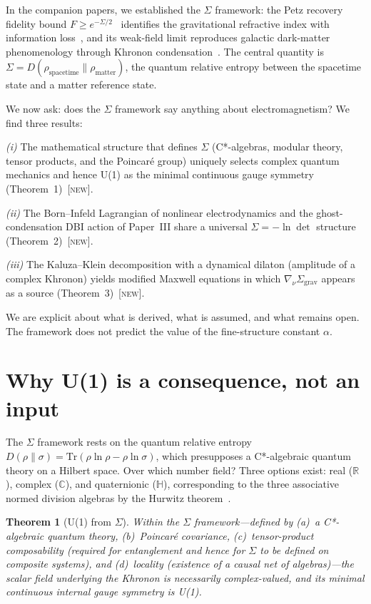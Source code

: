 \documentclass[prl,twocolumn,superscriptaddress,longbibliography]{revtex4-2}
\newtheorem{theorem}{Theorem}
\newcommand{\Tr}{\mathrm{Tr}}
\newcommand{\Sgrav}{\Sigma_{\mathrm{grav}}}
\newcommand{\new}{\textsc{[new]}}
\begin{document}
In the companion papers, we established the $\Sigma$ framework:
the Petz recovery fidelity bound
$F \geq e^{-\Sigma/2}$~\cite{PaperI} identifies the
gravitational refractive index with information loss~\cite{PaperII},
and its weak-field limit reproduces galactic dark-matter
phenomenology through Khronon condensation~\cite{PaperIII}.
The central quantity is
$\Sigma = D(\rho_{\mathrm{spacetime}} \| \rho_{\mathrm{matter}})$,
the quantum relative entropy between the spacetime state and a
matter reference state.

We now ask: does the $\Sigma$ framework say anything about
electromagnetism?
We find three results:

\textit{(i)} The mathematical structure that defines $\Sigma$
(C*-algebras, modular theory, tensor products, and the
Poincar\'{e} group) uniquely selects complex quantum mechanics
and hence U(1) as the minimal continuous gauge symmetry
(Theorem~1)~\new{}.

\textit{(ii)} The Born--Infeld Lagrangian of nonlinear
electrodynamics and the ghost-condensation DBI action of
Paper~III share a universal $\Sigma = -\ln\det$ structure
(Theorem~2)~\new{}.

\textit{(iii)} The Kaluza--Klein decomposition with a dynamical
dilaton (amplitude of a complex Khronon) yields modified Maxwell
equations in which $\nabla_\nu\Sgrav$ appears as a source
(Theorem~3)~\new{}.

We are explicit about what is derived, what is assumed, and what
remains open.
The framework does not predict the value of the fine-structure
constant $\alpha$.

\section{Why U(1) is a consequence, not an input}
\label{sec:u1}

The $\Sigma$ framework rests on the quantum relative entropy
$D(\rho\|\sigma) = \Tr(\rho\ln\rho - \rho\ln\sigma)$, which
presupposes a C*-algebraic quantum theory on a Hilbert space.
Over which number field?
Three options exist: real ($\mathbb{R}$), complex ($\mathbb{C}$),
and quaternionic ($\mathbb{H}$), corresponding to the three
associative normed division algebras by the Hurwitz
theorem~\cite{Solèr1995}.

\begin{theorem}[U(1) from $\Sigma$]
\label{thm:u1}
Within the $\Sigma$ framework---defined by
(a)~a C*-algebraic quantum theory,
(b)~Poincar\'{e} covariance,
(c)~tensor-product composability (required for entanglement
and hence for $\Sigma$ to be defined on composite systems),
and (d)~locality (existence of a causal net of
algebras)---the scalar field underlying the Khronon is
necessarily complex-valued, and its minimal continuous internal
gauge symmetry is U(1).
\end{theorem}
\end{document}
